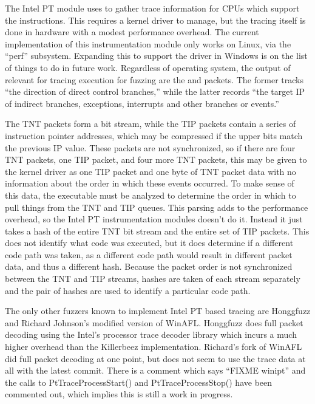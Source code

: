 The Intel PT module uses \IPT{} to gather trace information for CPUs which
support the \IPT{} instructions. This requires a kernel driver to manage, but
the tracing itself is done in hardware with a modest performance overhead. The
current implementation of this instrumentation module only works on Linux, via
the ``perf'' subsystem. Expanding this to support the \IPT{} driver in Windows
is on the list of things to do in future work. Regardless of operating system,
the output of \IPT{} relevant for tracing execution for fuzzing are the \TNT{} and
\TIP{} packets.  The former tracks ``the direction of direct control branches,''
while the latter records ``the target IP of indirect branches, exceptions,
interrupts and other branches or events.''\cite{intelptmanual}

The TNT packets form a bit stream, while the TIP packets contain a series of
instruction pointer addresses, which may be compressed if the upper bits match
the previous IP value. These packets are not synchronized, so if there are four
TNT packets, one TIP packet, and four more TNT packets, this may be given to
the kernel driver as one TIP packet and one byte of TNT packet data with no
information about the order in which these events occurred.  To make sense of
this data, the executable must be analyzed to determine the order in which to
pull things from the TNT and TIP queues. This parsing adds to the performance
overhead, so the Intel PT instrumentation modules doesn't do it. Instead it just
takes a hash of the entire TNT bit stream and the entire set of TIP packets.
This does not identify what code was executed, but it does determine if a
different code path was taken, as a different code path would result in
different packet data, and thus a different hash. Because the packet order is
not synchronized between the TNT and TIP streams, hashes are taken of each
stream separately and the pair of hashes are used to identify a particular code path.

The only other fuzzers known to implement Intel PT based tracing are
Honggfuzz\cite{honggfuzz} and Richard Johnson's modified version of
WinAFL\cite{winaflintelpt}. Honggfuzz does full packet decoding using the
Intel's processor trace decoder library\cite{libipt} which incurs a much
higher overhead than the Killerbeez implementation.  Richard's fork of WinAFL
did full packet decoding at one point, but does not seem to use the trace data
at all with the latest commit.\cite{winaflcommit} There is a comment which says
``FIXME winipt'' and the calls to PtTraceProcessStart() and
PtTraceProcessStop() have been commented out, which implies this is still a
work in progress.

